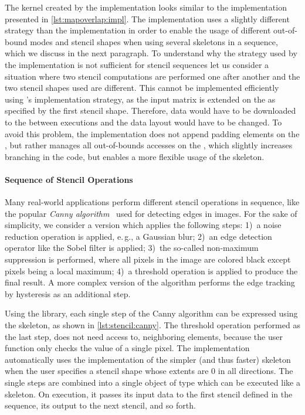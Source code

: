 The \OpenCL kernel created by the  implementation looks similar to the  implementation presented in \autoref{lst:mapoverlap:impl}.
The  implementation uses a slightly different strategy than the  implementation in order to enable the usage of different out-of-bound modes and stencil shapes when using several \stencil skeletons in a sequence, which we discuss in the next paragraph.
To understand why the strategy used by the  implementation is not sufficient for stencil sequences let us consider a situation where two stencil computations are performed one after another and the two stencil shapes used are different.
This cannot be implemented efficiently using 's implementation strategy, as the input matrix is extended on the \CPU as specified by the first stencil shape.
Therefore, data would have to be downloaded to the \CPU between executions and the data layout would have to be changed.
To avoid this problem, the  implementation does not append padding elements on the \CPU, but rather manages all out-of-bounds accesses on the \GPU, which slightly increases branching in the code, but enables a more flexible usage of the skeleton.


\paragraph{Sequence of Stencil Operations}
Many real-world applications perform different stencil operations in sequence, like the popular \emph{Canny algorithm}~\cite{NixonAg2012} used for detecting edges in images.
For the sake of simplicity, we consider a version which applies the following steps:
1)~a noise reduction operation is applied, e.\,g., a Gaussian blur;
2)~an edge detection operator like the Sobel filter is applied;
3)~the so-called non-maximum suppression is performed, where all pixels in the image are colored black except pixels being a local maximum;
4)~a threshold operation is applied to produce the final result.
A more complex version of the algorithm performs the edge tracking by hysteresis as an additional step.

Using the \SkelCL library, each single step of the Canny algorithm can be expressed using the \stencil skeleton, as shown in \autoref{lst:stencil:canny}.
The threshold operation performed as the last step, does not need access to, neighboring elements, because the user function only checks the value of a single pixel.
The  implementation automatically uses the implementation of the simpler (and thus faster) \map skeleton when the user specifies a stencil shape whose extents are $0$ in all directions.
The single steps are combined into a single object of type  which can be executed like a \stencil skeleton.
On execution, it passes its input data to the first stencil defined in the sequence, its output to the next stencil, and so forth.

